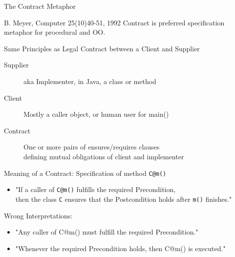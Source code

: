 \begin{frame}{The Contract Metaphor}
  \begin{boitequote}{B. Meyer, Computer 25(10)40-51, 1992}
    \hspace{-1.5em}\alert{Contract} is preferred specification metaphor for
    procedural and OO.
  \end{boitequote}\bigskip

  \begin{block}{Same Principles as \alert{Legal Contract} between a Client and
      Supplier}
    \begin{description}
    \item[Supplier] aka Implementer, in Java, a class or method
    \item[Client] Mostly a caller object, or human user for main()
    \item[Contract] One or more pairs of ensures/requires clauses\\
           defining mutual obligations of client and implementer
    \end{description}
  \end{block}

  \begin{block}{Meaning of a Contract: Specification of method \texttt{C@m()}}
    \begin{itemize}
    \item "If a caller of \texttt{C@m()} fulfills the \alert{required
        Precondition},\\ then the class \texttt{C} \alert{ensures} that the
      \alert{Postcondition} holds after \texttt{m()} finishes."
    \end{itemize}
  \end{block}
  \begin{block}{Wrong Interpretations:}
    \begin{itemize}
    \item "Any caller of C@m() must fulfill the required Precondition."
    \item "Whenever the required Precondition holds, then C@m() is executed."
    \end{itemize}
  \end{block}
\end{frame}
